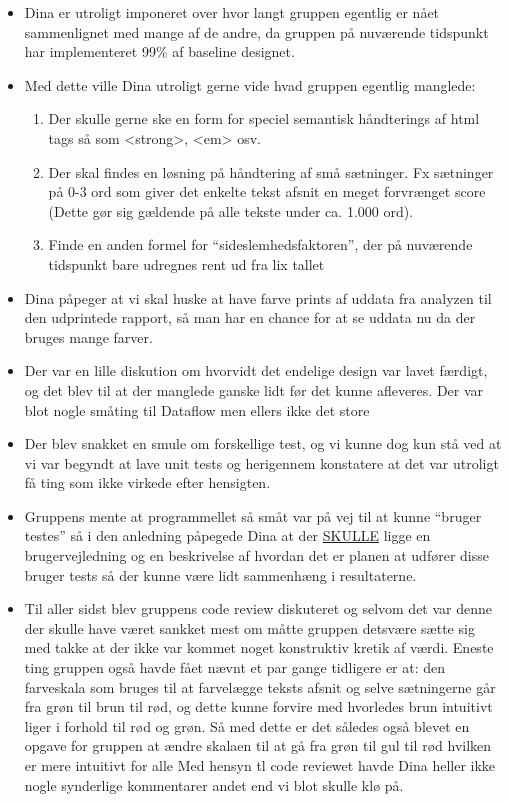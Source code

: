 \documentclass[a4paper,10pt,draft]{article}
\begin{document}
\begin{itemize}

\item Dina er utroligt imponeret over hvor langt gruppen egentlig er nået sammenlignet med mange af de andre, da gruppen på nuværende tidspunkt har implementeret 99\% af baseline designet.

\item Med dette ville Dina utroligt gerne vide hvad gruppen egentlig manglede:

\begin{enumerate}
 \item Der skulle gerne ske en form for speciel semantisk håndterings af html tags så som <strong>, <em> osv.
\item Der skal findes en løsning på håndtering af små sætninger. Fx sætninger på 0-3 ord som giver det enkelte tekst afsnit en meget forvrænget score (Dette gør sig gældende på alle tekste under ca. 1.000 ord).
\item Finde en anden formel for ``sideslemhedsfaktoren'', der på nuværende tidspunkt bare udregnes rent ud fra lix tallet
\end{enumerate}

\item Dina påpeger at vi skal huske at have farve prints af uddata fra analyzen til den udprintede rapport, så man har en chance for at se uddata nu da der bruges mange farver.

\item Der var en lille diskution om hvorvidt det endelige design var lavet færdigt, og det blev til at der manglede ganske lidt før det kunne afleveres. Der var blot nogle småting til Dataflow men ellers ikke det store

\item Der blev snakket en smule om forskellige test, og vi kunne dog kun stå ved at vi var begyndt at lave unit tests og herigennem konstatere at det var utroligt få ting som ikke virkede efter hensigten.

\item Gruppens mente at programmellet så småt var på vej til at kunne ``bruger testes'' så i den anledning påpegede Dina at der \underline{SKULLE} ligge en brugervejledning og en beskrivelse af hvordan det er planen at udfører disse bruger tests så der kunne være lidt sammenhæng i resultaterne.

\item Til aller sidst blev gruppens code review diskuteret og selvom det var denne der skulle have været sankket mest om måtte gruppen detsvære sætte sig med takke at der ikke var kommet noget konstruktiv kretik af værdi.
Eneste ting gruppen også havde fået nævnt et par gange tidligere er at: den farveskala som bruges til at farvelægge teksts afsnit og selve sætningerne går fra grøn til brun til rød, og dette kunne forvire med hvorledes brun intuitivt liger i forhold til rød og grøn. Så med dette er det således også blevet en opgave for gruppen at ændre skalaen til at gå fra grøn til gul til rød hvilken er mere intuitivt for alle 
Med hensyn tl code reviewet havde Dina heller ikke nogle synderlige kommentarer andet end vi blot skulle klø på.

\end{itemize}
\end{document}
